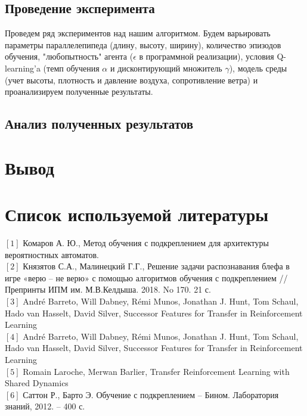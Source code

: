 \documentclass[12pt, a4paper]{report}
\theoremstyle{definition}
\theoremstyle{plain}
\theoremstyle{remark}
\theoremstyle{remark}
\theoremstyle{definition}
\begin{document}
\subsection{Проведение эксперимента}
Проведем ряд экспериментов над нашим алгоритмом. Будем варьировать параметры параллелепипеда (длину, высоту, ширину), количество эпизодов обучения, "любопытность" агента ($\epsilon $ в программной реализации), условия Q-learning'a (темп обучения $\alpha$ и дисконтирующий множитель $\gamma$), модель среды (учет высоты, плотность и давление воздуха, сопротивление ветра) и проанализируем полученные результаты.
\subsection{Анализ полученных результатов}
\section{Вывод}

\newpage
\section{Список используемой литературы} 
$[1]$ Комаров А. Ю., Метод обучения с подкреплением для архитектуры вероятностных автоматов.\\
$[2]$ Князятов С.А., Малинецкий Г.Г.,
Решение задачи распознавания блефа в игре «верю – не верю» с помощью алгоритмов
обучения с подкреплением // Препринты ИПМ им. М.В.Келдыша. 2018. No 170. 21 с.\\
$[3]$ André Barreto, Will Dabney, Rémi Munos, Jonathan J. Hunt,
Tom Schaul, Hado van Hasselt, David Silver, Successor Features for
Transfer in Reinforcement Learning \\
$[4]$ André Barreto, Will Dabney, Rémi Munos, Jonathan J. Hunt,
Tom Schaul, Hado van Hasselt, David Silver, Successor Features for
Transfer in Reinforcement Learning \\
$[5]$ Romain Laroche, Merwan Barlier, Transfer Reinforcement Learning with Shared Dynamics \\
$[6]$ Саттон Р., Барто Э. Обучение с подкреплением – Бином. Лаборатория знаний,
2012. – 400 с.
\end{document}
